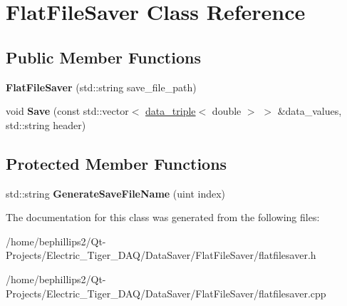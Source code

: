 \hypertarget{class_flat_file_saver}{}\section{Flat\+File\+Saver Class Reference}
\label{class_flat_file_saver}
\subsection*{Public Member Functions}
\begin{DoxyCompactItemize}
\item 
{\bfseries Flat\+File\+Saver} (std\+::string save\+\_\+file\+\_\+path)\hypertarget{class_flat_file_saver_aa755dafabdc59a86dc260cd24d201c3e}{}\label{class_flat_file_saver_aa755dafabdc59a86dc260cd24d201c3e}

\item 
void {\bfseries Save} (const std\+::vector$<$ \hyperlink{structdata__triple}{data\+\_\+triple}$<$ double $>$ $>$ \&data\+\_\+values, std\+::string header)\hypertarget{class_flat_file_saver_a58082944de548ff9a53bd04e6c9ea8d5}{}\label{class_flat_file_saver_a58082944de548ff9a53bd04e6c9ea8d5}

\end{DoxyCompactItemize}
\subsection*{Protected Member Functions}
\begin{DoxyCompactItemize}
\item 
std\+::string {\bfseries Generate\+Save\+File\+Name} (uint index)\hypertarget{class_flat_file_saver_ad23419439ebf98aaac5affc720d92b73}{}\label{class_flat_file_saver_ad23419439ebf98aaac5affc720d92b73}

\end{DoxyCompactItemize}


The documentation for this class was generated from the following files\+:\begin{DoxyCompactItemize}
\item 
/home/bephillips2/\+Qt-\/\+Projects/\+Electric\+\_\+\+Tiger\+\_\+\+D\+A\+Q/\+Data\+Saver/\+Flat\+File\+Saver/flatfilesaver.\+h\item 
/home/bephillips2/\+Qt-\/\+Projects/\+Electric\+\_\+\+Tiger\+\_\+\+D\+A\+Q/\+Data\+Saver/\+Flat\+File\+Saver/flatfilesaver.\+cpp\end{DoxyCompactItemize}
